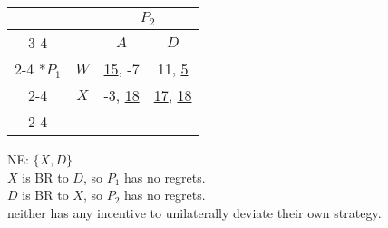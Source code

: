 \documentclass{article}
\begin{document}
\begin{question}
\begin{solution}
\begin{tasks}
\begin{enumerate}
    \end{enumerate}
      \begin{center}
        \begin{tabular}{*{4}{c|}}
          \multicolumn{2}{c}{} & \multicolumn{2}{c}{$P_2$} \\ \cline{3-4}
          \multicolumn{1}{c}{} &     & $A$    & $D$ \\ \cline{2-4}
          \multirow{2}*{$P_1$} & $W$ & \underline{15}, -7 & 11, \underline{5} \\ \cline{2-4}
                               & $X$ & -3, \underline{18} & \underline{17}, \underline{18} \\ \cline{2-4}
        \end{tabular}
      \end{center}
      \task
      NE: $\{X,D\}$ \\
      $X$ is BR to $D$, so $P_1$ has no regrets. \\
      $D$ is BR to $X$, so $P_2$ has no regrets. \\
      neither has any incentive to unilaterally deviate their own strategy.
  \end{tasks}
\end{solution}
\end{question}

\newpage

\end{document}
